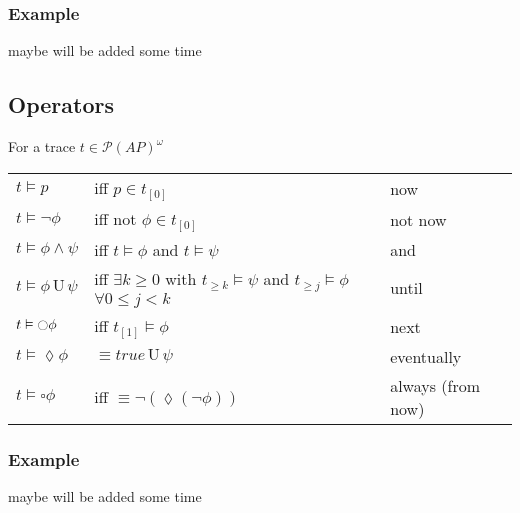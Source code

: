 \documentclass[11.5pt]{article}
\def\P{\mathcal{P}}
\def\unt{\, \text{U} \,}
\def\nex{\fullmoon}
\def\evt{\lozenge}
\def\alw{\square}
\begin{document}
\subsubsection{Example}
maybe will be added some time

\subsection{Operators}
For a trace $t\in\P(AP)^\omega$
\begin{center}
    \begin{tabular}{l l l}
        $t \vDash p$ & iff $p \in t_{[0]}$ & now \\
        $t \vDash\lnot \phi$ & iff not $\phi \in t_{[0]}$ & not now \\
        $t \vDash \phi \land \psi$ & iff $t \vDash \phi$ and $t \vDash \psi$ & and \\
        $t \vDash \phi \unt \psi$ & iff $\exists k \geq 0$ with  $t_{\geq k} \vDash \psi$ and $t_{\geq j} \vDash \phi$ $\forall 0 \leq j < k$ & until \\
        $t \vDash \nex \phi$ & iff  $t_{[1]} \vDash \phi$ & next \\
        $t \vDash \evt \phi$ & $\equiv true \unt \psi$ & eventually \\
        $t \vDash \alw \phi$ & iff  $\equiv \lnot (\evt (\lnot  \phi))$ & always (from now) \\
    \end{tabular}
\end{center}

\subsubsection{Example}
maybe will be added some time
\end{document}
